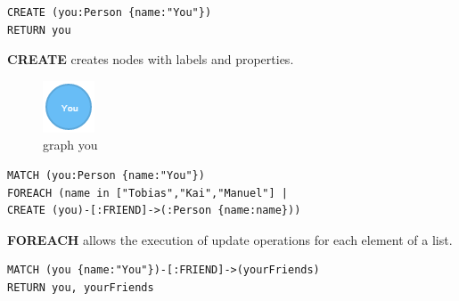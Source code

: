 \begin{lstlisting}[frame=single, caption=Create a Record, label=gcar]
CREATE (you:Person {name:"You"})
RETURN you
\end{lstlisting}
\textbf{CREATE} creates nodes with labels and properties.

\begin{figure}[H]
	\includegraphics[width=\linewidth,keepaspectratio]{images/neo4j/you.png}
	\caption{graph you}
\end{figure}

\begin{lstlisting}[frame=single, caption=Create Relations, label=gcrl]
MATCH (you:Person {name:"You"})
FOREACH (name in ["Tobias","Kai","Manuel"] |
CREATE (you)-[:FRIEND]->(:Person {name:name}))
\end{lstlisting}
\textbf{FOREACH} allows the execution of update operations for each element of a list.

\begin{lstlisting}[frame=single, caption=Show Relations, label=gshrl]
MATCH (you {name:"You"})-[:FRIEND]->(yourFriends)
RETURN you, yourFriends
\end{lstlisting}

